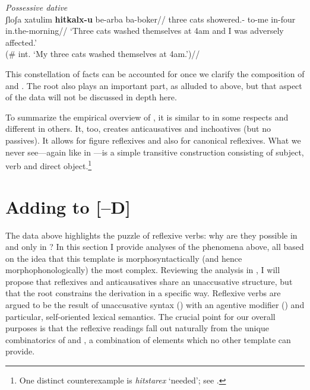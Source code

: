 \ex \textit{Possessive dative}\\
	\begingl 
	\gla \ljudge{\#}ʃloʃa xatulim \textbf{hitkalx-u}  be-arba ba-boker//
	\glb three cats showered.- to-me in-four in.the-morning//
	\glft `Three cats washed themselves at 4am and I was adversely affected.'\\
		(\# int. `My three cats washed themselves at 4am.')//
	\endgl
\xe

This constellation of facts can be accounted for once we clarify the composition of {\va} and {\vz}. The root also plays an important part, as alluded to above, but that aspect of the data will not be discussed in depth here.

To summarize the empirical overview of {\thit}, it is similar to {\tnif} in some respects and different in others. It, too, creates anticausatives and inchoatives (but no passives). It allows for figure reflexives and also for canonical reflexives. What we never see---again like in {\tnif}---is a simple transitive construction consisting of subject, verb and direct object.\footnote{One distinct counterexample is \emph{hitstarex} `needed'; see \cite[130ff16]{harveskayne12}.}



\section{Adding {\va} to [--D]} \label{vz:va}
The data above highlights the puzzle of reflexive verbs: why are they possible in {\thit} and only in {\thit}? In this section I provide analyses of the phenomena above, all based on the idea that this template is morphosyntactically (and hence morphophonologically) the most complex. Reviewing the analysis in \cite{kastner17gjgl}, I will propose that reflexives and anticausatives share an unaccusative structure, but that the root constrains the derivation in a specific way. Reflexive verbs are argued to be the result of unaccusative syntax (\vz) with an agentive modifier (\va) and particular, self-oriented lexical semantics. The crucial point for our overall purposes is that the reflexive readings fall out naturally from the unique combinatorics of {\vz} and {\va}, a combination of elements which no other template can provide.

